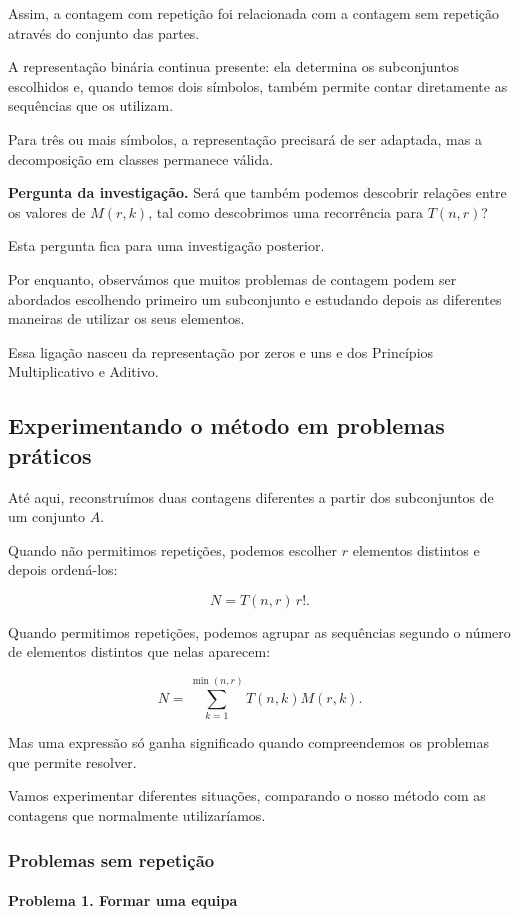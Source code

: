 \documentclass[11pt,a4paper,oneside]{book}
\newcommand{\Pergunta}[1]{\begin{perguntabox}\textbf{Pergunta da investigação.} #1\end{perguntabox}}
\begin{document}
Assim, a contagem com repetição
foi relacionada com a contagem sem repetição
através do conjunto das partes.

A representação binária continua presente:
ela determina os subconjuntos escolhidos
e, quando temos dois símbolos, também permite
contar diretamente as sequências que os utilizam.

Para três ou mais símbolos, a representação
precisará de ser adaptada, mas a decomposição
em classes permanece válida.

\Pergunta{Será que também podemos descobrir
relações entre os valores de $M(r,k)$,
tal como descobrimos uma recorrência
para $T(n,r)$?}

Esta pergunta fica para uma investigação
posterior.

Por enquanto, observámos que muitos problemas
de contagem podem ser abordados escolhendo
primeiro um subconjunto e estudando depois
as diferentes maneiras de utilizar os seus
elementos.

Essa ligação nasceu da representação
por zeros e uns e dos Princípios
Multiplicativo e Aditivo.


\subsection*{Experimentando o método em problemas práticos}

Até aqui, reconstruímos duas contagens diferentes
a partir dos subconjuntos de um conjunto $A$.

Quando não permitimos repetições, podemos escolher
$r$ elementos distintos e depois ordená-los:

\[
N=T(n,r)\,r!.
\]

Quando permitimos repetições, podemos agrupar
as sequências segundo o número de elementos
distintos que nelas aparecem:

\[
N=\sum_{k=1}^{\min(n,r)}T(n,k)M(r,k).
\]

Mas uma expressão só ganha significado quando
compreendemos os problemas que permite resolver.

Vamos experimentar diferentes situações,
comparando o nosso método com as contagens
que normalmente utilizaríamos.

\subsubsection*{Problemas sem repetição}

\paragraph{Problema 1. Formar uma equipa}
\end{document}

